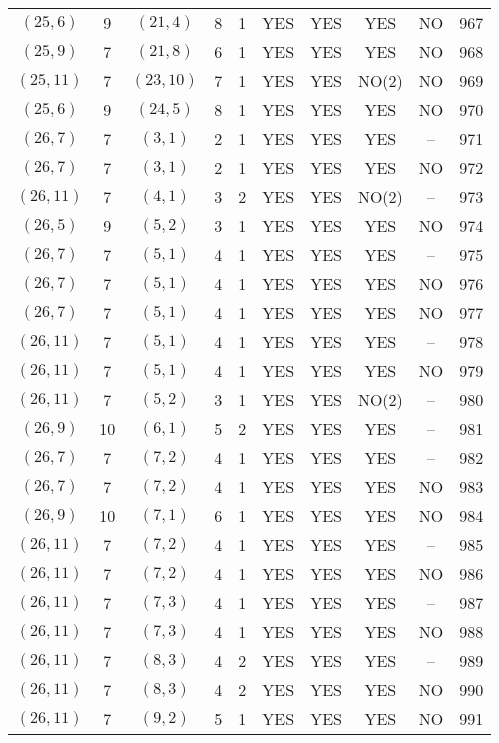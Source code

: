 \begin{longtable}{|c|c|c|c|c|c|c|c|c|c|}
$(25, 6)$ & 9 & $(21, 4)$ & 8 & 1 & YES & YES & YES & NO & 967\\
$(25, 9)$ & 7 & $(21, 8)$ & 6 & 1 & YES & YES & YES & NO & 968\\
$(25, 11)$ & 7 & $(23, 10)$ & 7 & 1 & YES & YES & NO(2) & NO & 969\\
$(25, 6)$ & 9 & $(24, 5)$ & 8 & 1 & YES & YES & YES & NO & 970\\
$(26, 7)$ & 7 & $(3, 1)$ & 2 & 1 & YES & YES & YES & -- & 971\\
$(26, 7)$ & 7 & $(3, 1)$ & 2 & 1 & YES & YES & YES & NO & 972\\
$(26, 11)$ & 7 & $(4, 1)$ & 3 & 2 & YES & YES & NO(2) & -- & 973\\
$(26, 5)$ & 9 & $(5, 2)$ & 3 & 1 & YES & YES & YES & NO & 974\\
$(26, 7)$ & 7 & $(5, 1)$ & 4 & 1 & YES & YES & YES & -- & 975\\
$(26, 7)$ & 7 & $(5, 1)$ & 4 & 1 & YES & YES & YES & NO & 976\\
$(26, 7)$ & 7 & $(5, 1)$ & 4 & 1 & YES & YES & YES & NO & 977\\
$(26, 11)$ & 7 & $(5, 1)$ & 4 & 1 & YES & YES & YES & -- & 978\\
$(26, 11)$ & 7 & $(5, 1)$ & 4 & 1 & YES & YES & YES & NO & 979\\
$(26, 11)$ & 7 & $(5, 2)$ & 3 & 1 & YES & YES & NO(2) & -- & 980\\
$(26, 9)$ & 10 & $(6, 1)$ & 5 & 2 & YES & YES & YES & -- & 981\\
$(26, 7)$ & 7 & $(7, 2)$ & 4 & 1 & YES & YES & YES & -- & 982\\
$(26, 7)$ & 7 & $(7, 2)$ & 4 & 1 & YES & YES & YES & NO & 983\\
$(26, 9)$ & 10 & $(7, 1)$ & 6 & 1 & YES & YES & YES & NO & 984\\
$(26, 11)$ & 7 & $(7, 2)$ & 4 & 1 & YES & YES & YES & -- & 985\\
$(26, 11)$ & 7 & $(7, 2)$ & 4 & 1 & YES & YES & YES & NO & 986\\
$(26, 11)$ & 7 & $(7, 3)$ & 4 & 1 & YES & YES & YES & -- & 987\\
$(26, 11)$ & 7 & $(7, 3)$ & 4 & 1 & YES & YES & YES & NO & 988\\
$(26, 11)$ & 7 & $(8, 3)$ & 4 & 2 & YES & YES & YES & -- & 989\\
$(26, 11)$ & 7 & $(8, 3)$ & 4 & 2 & YES & YES & YES & NO & 990\\
$(26, 11)$ & 7 & $(9, 2)$ & 5 & 1 & YES & YES & YES & NO & 991\\

\end{longtable}
